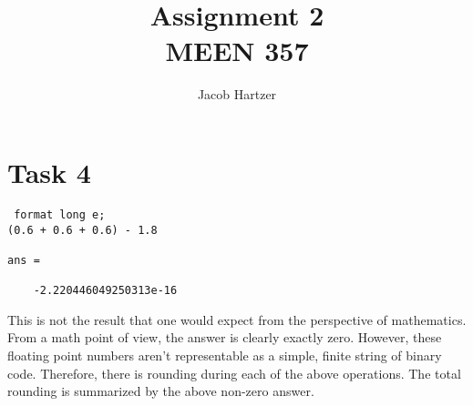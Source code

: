 \documentclass[12pt]{article}
\begin{document}
 
 
\title{Assignment 2\\ MEEN 357}
\author{Jacob Hartzer}
\maketitle
 
\section*{Task 4}

\begin{lstlisting}
 format long e;
(0.6 + 0.6 + 0.6) - 1.8

ans = 

	-2.220446049250313e-16

\end{lstlisting}


This is not the result that one would expect from the perspective of mathematics. From a math point of view, the answer is clearly exactly zero. However, these floating point numbers aren’t representable as a simple, finite string of binary code. Therefore, there is rounding during each of the above operations. The total rounding is summarized by the above non-zero answer.
\end{document}
